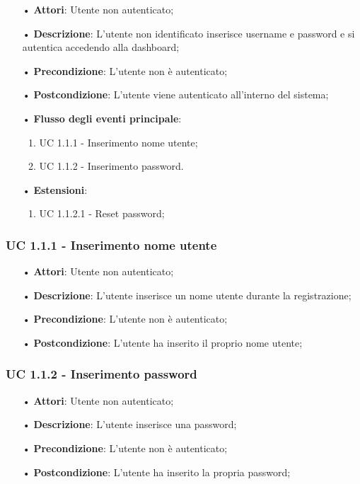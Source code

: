 \begin{itemize}
\item[•]\textbf{Attori}: Utente non autenticato;
\item[•]\textbf{Descrizione}:  L’utente non identificato inserisce username e password e si autentica accedendo alla dashboard;
\item[•]\textbf{Precondizione}: L’utente non è autenticato;
\item[•]\textbf{Postcondizione}: L’utente viene autenticato all’interno del sistema;
\item[•]\textbf{Flusso degli eventi principale}:
\begin{enumerate}
\item UC 1.1.1 - Inserimento nome utente;
\item UC 1.1.2 - Inserimento password.
\end{enumerate}
\item[•]\textbf{Estensioni}:
\begin{enumerate}
\item UC 1.1.2.1 - Reset password;

\end{enumerate}
\end{itemize}

\subsubsection{UC 1.1.1 - Inserimento nome utente}
\begin{itemize}
\item[•]\textbf{Attori}: Utente non autenticato;
\item[•]\textbf{Descrizione}: L’utente inserisce un nome utente durante la registrazione;
\item[•]\textbf{Precondizione}: L’utente non è autenticato;
\item[•]\textbf{Postcondizione}: L’utente ha inserito il proprio nome utente;
\end{itemize}

\subsubsection{UC 1.1.2 - Inserimento password}
\begin{itemize}
\item[•]\textbf{Attori}: Utente non autenticato;
\item[•]\textbf{Descrizione}: L’utente inserisce una password;
\item[•]\textbf{Precondizione}: L'utente non è autenticato;
\item[•]\textbf{Postcondizione}: L'utente ha inserito la propria password;
\end{itemize}

